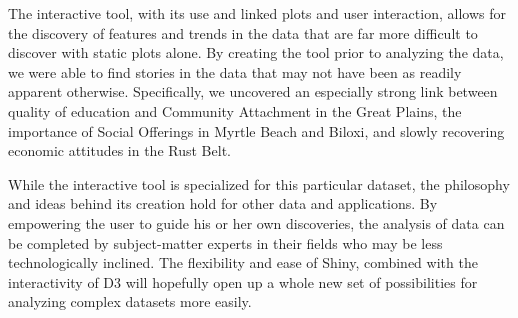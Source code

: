 \documentclass[11pt]{article}\usepackage{knitr}
\begin{document}
The interactive tool, with its use and linked plots and user interaction, allows for the discovery of features and trends in the data that are far more difficult to discover with static plots alone. By creating the tool prior to analyzing the data, we were able to find stories in the data that may not have been as readily apparent otherwise. Specifically, we uncovered an especially strong link between quality of education and Community Attachment in the Great Plains, the importance of Social Offerings in Myrtle Beach and Biloxi, and slowly recovering economic attitudes in the Rust Belt.

While the interactive tool is specialized for this particular dataset, the philosophy and ideas behind its creation hold for other data and applications. By empowering the user to guide his or her own discoveries, the analysis of data can be completed by subject-matter experts in their fields who may be less technologically inclined. The flexibility and ease of Shiny, combined with the interactivity of D3 will hopefully open up a whole new set of possibilities for analyzing complex datasets more easily.


\clearpage

\printbibliography
\end{document}
